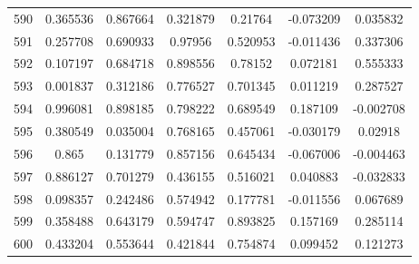 \begin{table}
\begin{tabular}{c|c|c|c|c|c|c}
590 & 0.365536 & 0.867664 & 0.321879 & 0.21764 & -0.073209 & 0.035832\\
591 & 0.257708 & 0.690933 & 0.97956 & 0.520953 & -0.011436 & 0.337306\\
592 & 0.107197 & 0.684718 & 0.898556 & 0.78152 & 0.072181 & 0.555333\\
593 & 0.001837 & 0.312186 & 0.776527 & 0.701345 & 0.011219 & 0.287527\\
594 & 0.996081 & 0.898185 & 0.798222 & 0.689549 & 0.187109 & -0.002708\\
595 & 0.380549 & 0.035004 & 0.768165 & 0.457061 & -0.030179 & 0.02918\\
596 & 0.865 & 0.131779 & 0.857156 & 0.645434 & -0.067006 & -0.004463\\
597 & 0.886127 & 0.701279 & 0.436155 & 0.516021 & 0.040883 & -0.032833\\
598 & 0.098357 & 0.242486 & 0.574942 & 0.177781 & -0.011556 & 0.067689\\
599 & 0.358488 & 0.643179 & 0.594747 & 0.893825 & 0.157169 & 0.285114\\
600 & 0.433204 & 0.553644 & 0.421844 & 0.754874 & 0.099452 & 0.121273\\
\end{tabular}
\end{table}
\newpage

